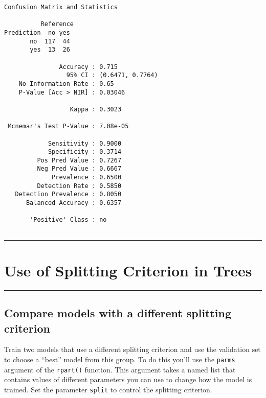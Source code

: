 \documentclass[
]{book}
\begin{document}
\begin{verbatim}
Confusion Matrix and Statistics

          Reference
Prediction  no yes
       no  117  44
       yes  13  26
                                          
               Accuracy : 0.715           
                 95% CI : (0.6471, 0.7764)
    No Information Rate : 0.65            
    P-Value [Acc > NIR] : 0.03046         
                                          
                  Kappa : 0.3023          
                                          
 Mcnemar's Test P-Value : 7.08e-05        
                                          
            Sensitivity : 0.9000          
            Specificity : 0.3714          
         Pos Pred Value : 0.7267          
         Neg Pred Value : 0.6667          
             Prevalence : 0.6500          
         Detection Rate : 0.5850          
   Detection Prevalence : 0.8050          
      Balanced Accuracy : 0.6357          
                                          
       'Positive' Class : no              
                                          
\end{verbatim}

\begin{center}\rule{0.5\linewidth}{0.5pt}\end{center}

\hypertarget{use-of-splitting-criterion-in-trees}{%
\section{Use of Splitting Criterion in Trees}\label{use-of-splitting-criterion-in-trees}}

\begin{center}\rule{0.5\linewidth}{0.5pt}\end{center}

\hypertarget{compare-models-with-a-different-splitting-criterion}{%
\subsection{Compare models with a different splitting criterion}\label{compare-models-with-a-different-splitting-criterion}}

Train two models that use a different splitting criterion and use the validation set to choose a ``best'' model from this group. To do this you'll use the \texttt{parms} argument of the \texttt{rpart()} function. This argument takes a named list that contains values of different parameters you can use to change how the model is trained. Set the parameter \texttt{split} to control the splitting criterion.
\end{document}
